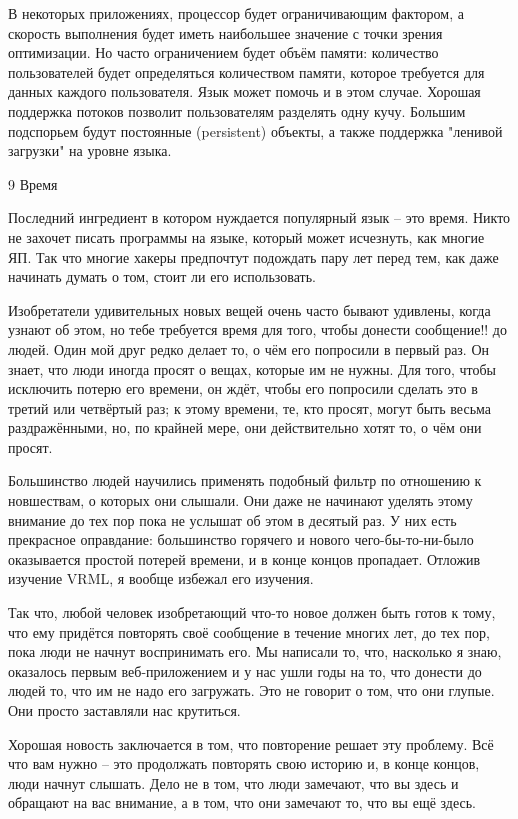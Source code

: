 \documentclass[ebook,12pt,oneside,openany]{memoir}
\begin{document}
В некоторых приложениях, процессор будет ограничивающим фактором, а
скорость выполнения будет иметь наибольшее значение с точки зрения
оптимизации. Но часто ограничением будет объём памяти: количество
пользователей будет определяться количеством памяти, которое требуется
для данных каждого пользователя. Язык может помочь и в этом случае.
Хорошая поддержка потоков позволит пользователям разделять одну кучу.
Большим подспорьем будут постоянные (persistent) объекты, а также
поддержка "ленивой загрузки" на уровне языка.

9 Время

Последний ингредиент в котором нуждается популярный язык -- это время.
Никто не захочет писать программы на языке, который может исчезнуть,
как многие ЯП. Так что многие хакеры предпочтут подождать пару лет
перед тем, как даже начинать думать о том, стоит ли его использовать.

Изобретатели удивительных новых вещей очень часто бывают удивлены,
когда узнают об этом, но тебе требуется время для того, чтобы донести
сообщение!! до людей. Один мой друг редко делает то, о чём его
попросили в первый раз. Он знает, что люди иногда просят о вещах,
которые им не нужны. Для того, чтобы исключить потерю его времени, он
ждёт, чтобы его попросили сделать это в третий или четвёртый раз; к
этому времени, те, кто просят, могут быть весьма раздражёнными, но, по
крайней мере, они действительно хотят то, о чём они просят.

Большинство людей научились применять подобный фильтр по отношению к
новшествам, о которых они слышали. Они даже не начинают уделять этому
внимание до тех пор пока не услышат об этом в десятый раз. У них есть
прекрасное оправдание: большинство горячего и нового
чего-бы-то-ни-было оказывается простой потерей времени, и в конце
концов пропадает. Отложив изучение VRML, я вообще избежал его
изучения.

Так что, любой человек изобретающий что-то новое должен быть готов к
тому, что ему придётся повторять своё сообщение в течение многих лет,
до тех пор, пока люди не начнут воспринимать его. Мы написали то, что,
насколько я знаю, оказалось первым веб-приложением и у нас ушли годы
на то, что донести до людей то, что им не надо его загружать. Это не
говорит о том, что они глупые. Они просто заставляли нас крутиться.

Хорошая новость заключается в том, что повторение решает эту проблему.
Всё что вам нужно -- это продолжать повторять свою историю и, в конце
концов, люди начнут слышать. Дело не в том, что люди замечают, что вы
здесь и обращают на вас внимание, а в том, что они замечают то, что вы
ещё здесь.
\end{document}
